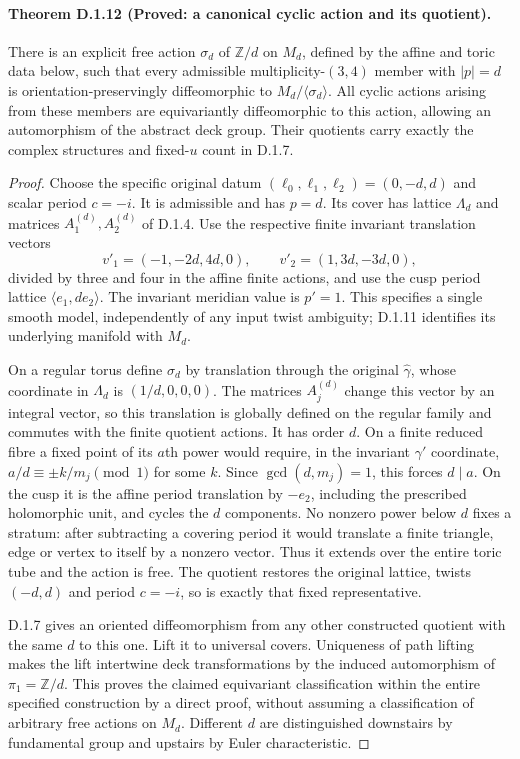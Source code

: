 \paragraph{Theorem D.1.12 (Proved: a canonical cyclic action and its quotient).}
There is an explicit free action $\sigma_d$ of $\mathbb Z/d$ on
$M_d$, defined by the affine and toric data below, such that every
admissible multiplicity-$(3,4)$ member with $|p|=d$ is
orientation-preservingly diffeomorphic to $M_d/\langle\sigma_d\rangle$.
All cyclic actions arising from these members are equivariantly
diffeomorphic to this action, allowing an automorphism of the
abstract deck group. Their quotients carry exactly the complex
structures and fixed-$u$ count in D.1.7.
\begin{proof}
Choose the specific original datum
$(\ell_0,\ell_1,\ell_2)=(0,-d,d)$ and scalar period $c=-i$.
It is admissible and has $p=d$. Its cover has lattice $\Lambda_d$
and matrices $A_1^{(d)},A_2^{(d)}$ of D.1.4. Use the respective
finite invariant translation vectors
\[
 v'_1=(-1,-2d,4d,0),\qquad v'_2=(1,3d,-3d,0),
\]
divided by three and four in the affine finite actions, and use
the cusp period lattice $\langle e_1,d e_2\rangle$. The invariant
meridian value is $p'=1$. This specifies a single smooth model,
independently of any input twist ambiguity; D.1.11 identifies its
underlying manifold with $M_d$.

On a regular torus define $\sigma_d$ by translation through the
original $\widehat\gamma$, whose coordinate in $\Lambda_d$ is
$(1/d,0,0,0)$. The matrices $A_j^{(d)}$ change this vector by an
integral vector, so this translation is globally defined on the
regular family and commutes with the finite quotient actions.
It has order $d$. On a finite reduced fibre a fixed point of its
$a$th power would require, in the invariant $\gamma'$ coordinate,
$a/d\equiv\pm k/m_j\pmod1$ for some $k$. Since $\gcd(d,m_j)=1$,
this forces $d\mid a$. On the cusp it is the affine period
translation by $-e_2$, including the prescribed holomorphic unit,
and cycles the $d$ components. No nonzero power below $d$ fixes a
stratum: after subtracting a covering period it would translate a
finite triangle, edge or vertex to itself by a nonzero vector.
Thus it extends over the entire toric tube and the action is free.
The quotient restores the original lattice, twists $(-d,d)$ and
period $c=-i$, so is exactly that fixed representative.

D.1.7 gives an oriented diffeomorphism from any other constructed
quotient with the same $d$ to this one. Lift it to universal covers.
Uniqueness of path lifting makes the lift intertwine deck
transformations by the induced automorphism of $\pi_1=\mathbb Z/d$.
This proves the claimed equivariant classification within the
entire specified construction by a direct proof, without assuming
a classification of arbitrary free actions on $M_d$. Different
$d$ are distinguished downstairs by fundamental group and upstairs
by Euler characteristic.


\end{proof}
